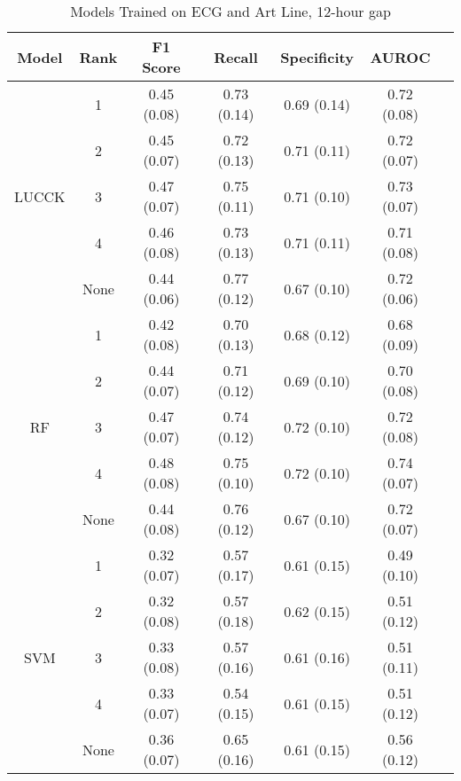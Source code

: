 \begin{table}
    \small
    \centering
    \caption{Models Trained on ECG and Art Line, 12-hour gap}
    \begin{tabularx}{\textwidth}{|c|c|C|C|C|C|C|}
        \hline
        Model & Rank & F1 Score & Recall & Specificity & AUROC \\
        \hline
         & 1 & 0.45 (0.08) & 0.73 (0.14) & 0.69 (0.14) & 0.72 (0.08)\\
         & 2 & 0.45 (0.07) & 0.72 (0.13) & 0.71 (0.11) & 0.72 (0.07)\\
        LUCCK & 3 & 0.47 (0.07) & 0.75 (0.11) & 0.71 (0.10) & 0.73 (0.07)\\
         & 4 & 0.46 (0.08) & 0.73 (0.13) & 0.71 (0.11) & 0.71 (0.08)\\
         & None & 0.44 (0.06) & 0.77 (0.12) & 0.67 (0.10) & 0.72 (0.06)\\
        \hline
         & 1 & 0.42 (0.08) & 0.70 (0.13) & 0.68 (0.12) & 0.68 (0.09)\\
         & 2 & 0.44 (0.07) & 0.71 (0.12) & 0.69 (0.10) & 0.70 (0.08)\\
        RF & 3 & 0.47 (0.07) & 0.74 (0.12) & 0.72 (0.10) & 0.72 (0.08)\\
         & 4 & 0.48 (0.08) & 0.75 (0.10) & 0.72 (0.10) & 0.74 (0.07)\\
         & None & 0.44 (0.08) & 0.76 (0.12) & 0.67 (0.10) & 0.72 (0.07)\\
        \hline
         & 1 & 0.32 (0.07) & 0.57 (0.17) & 0.61 (0.15) & 0.49 (0.10)\\
         & 2 & 0.32 (0.08) & 0.57 (0.18) & 0.62 (0.15) & 0.51 (0.12)\\
        SVM & 3 & 0.33 (0.08) & 0.57 (0.16) & 0.61 (0.16) & 0.51 (0.11)\\
         & 4 & 0.33 (0.07) & 0.54 (0.15) & 0.61 (0.15) & 0.51 (0.12)\\
         & None & 0.36 (0.07) & 0.65 (0.16) & 0.61 (0.15) & 0.56 (0.12)\\
         \hline
    \end{tabularx}
\end{table}

